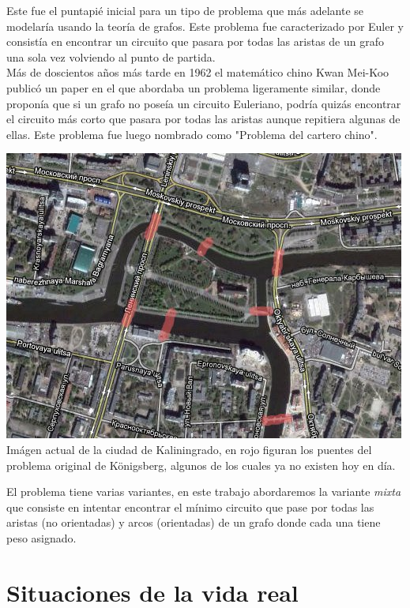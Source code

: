 \documentclass[11pt, a4paper, spanish]{article}
\begin{document}
Este fue el puntapi\'e inicial para un tipo de problema que m\'as adelante se modelar\'ia usando la teor\'ia de grafos. Este problema fue caracterizado por Euler y consist\'ia en encontrar un circuito que pasara por todas las aristas de un grafo una sola vez volviendo al punto de partida.\\
 
M\'as de doscientos a\~{n}os m\'as tarde en 1962 el matem\'atico chino Kwan Mei-Koo public\'o un paper en el que abordaba un problema ligeramente similar, donde propon\'ia que si un grafo no pose\'ia un circuito Euleriano, podr\'ia quiz\'as encontrar el circuito m\'as corto que pasara por todas las aristas aunque repitiera algunas de ellas. Este problema fue luego nombrado como "Problema del cartero chino".

\begin{center}
\centering \includegraphics[scale=0.70]{img/KaliningradoBridges.jpg}\\
\small{Im\'agen actual de la ciudad de Kaliningrado, en rojo figuran los puentes del problema original de K\"{o}nigsberg, algunos de los cuales ya no existen hoy en d\'ia.}
\end{center}	

El problema tiene varias variantes, en este trabajo abordaremos la variante \emph{mixta} que consiste en intentar encontrar el m\'inimo circuito que pase por todas las aristas (no orientadas) y arcos (orientadas) de un grafo donde cada una tiene peso asignado.

\newpage
\section{Situaciones de la vida real}
\end{document}

